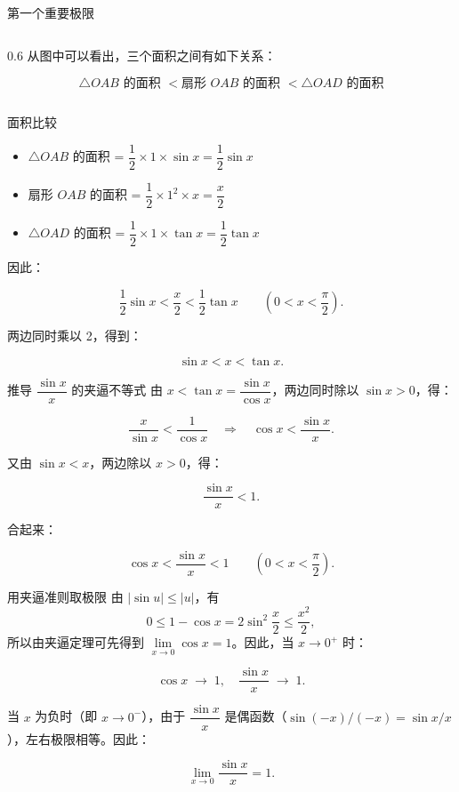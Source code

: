 \documentclass[aspectratio=169,10pt]{ctexbeamer}
\begin{document}
\begin{frame}{第一个重要极限}
\begin{columns}[c]
\begin{column}{0.6\textwidth}
				\vspace{0.5em} %
				从图中可以看出，三个面积之间有如下关系：
				
				\small 
				\[
				\triangle OAB \text{ 的面积 } < \text{扇形 } OAB \text{ 的面积 } < \triangle OAD \text{ 的面积}
				\]
			\end{column}
			
		\end{columns}

\end{frame}

\begin{frame}{面积比较}
	\begin{itemize}
		\item \(\triangle OAB\) 的面积 = \(\dfrac{1}{2} \times 1 \times \sin x = \dfrac{1}{2} \sin x\)
		\item 扇形 \(OAB\) 的面积 = \(\dfrac{1}{2} \times 1^2 \times x = \dfrac{x}{2}\)
		\item \(\triangle OAD\) 的面积 = \(\dfrac{1}{2} \times 1 \times \tan x = \dfrac{1}{2} \tan x\)
	\end{itemize}
	
	因此：
	
	\[
	\dfrac{1}{2} \sin x  <  \dfrac{x}{2} < \dfrac{1}{2} \tan x \qquad (0 < x < \dfrac{\pi}{2}).
	\]
	
	两边同时乘以 2，得到：
	
	\[
	\sin x  < x < \tan x.
	\]
\end{frame}


\begin{frame}{推导 \(\dfrac{\sin x}{x}\) 的夹逼不等式}
	由 \(x < \tan x = \dfrac{\sin x}{\cos x}\)，两边同时除以 \(\sin x > 0\)，得：
	
	\[
	\dfrac{x}{\sin x} < \dfrac{1}{\cos x} \quad \Longrightarrow \quad \cos x < \dfrac{\sin x}{x}.
	\]
	
	又由 \(\sin x < x\)，两边除以 \(x > 0\)，得：
	
	\[
	\dfrac{\sin x}{x} < 1.
	\]
	
	合起来：
	
	\[
	\cos x < \dfrac{\sin x}{x} < 1 \qquad (0 < x < \dfrac{\pi}{2}).
	\]
	
\end{frame}

\begin{frame}{用夹逼准则取极限}
	由 \(|\sin u|\leq|u|\)，有
	\[
	0\leq1-\cos x=2\sin^2\frac x2\leq\frac{x^2}{2},
	\]
	所以由夹逼定理可先得到 \(\lim\limits_{x\to0}\cos x=1\)。因此，当 \(x \to 0^+\) 时：
	
	\[
	\cos x \;\longrightarrow\; 1,\quad \dfrac{\sin x}{x} \;\longrightarrow\; 1.
	\]
	
	当 \(x\) 为负时（即 \(x \to 0^-\)），由于 \(\dfrac{\sin x}{x}\) 是偶函数（\(\sin(-x)/(-x) = \sin x / x\)），左右极限相等。因此：
	
	\[
	\lim\limits_{x \to 0} \dfrac{\sin x}{x} = 1.
	\]
\end{frame}
\end{document}
